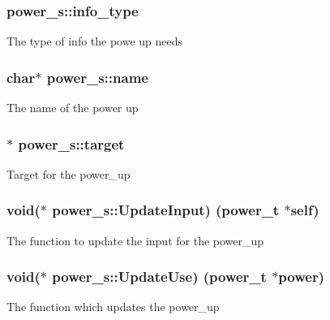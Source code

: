 \subsubsection[{\texorpdfstring{info\+\_\+type}{info_type}}]{ power\+\_\+s\+::info\+\_\+type}\hypertarget{structpower__s_a519c09477c21260a2be83a6ceb09cc33}{}\label{structpower__s_a519c09477c21260a2be83a6ceb09cc33}
The type of info the powe up needs 
\subsubsection[{\texorpdfstring{name}{name}}]{\setlength{\rightskip}{0pt plus 5cm}char$\ast$ power\+\_\+s\+::name}\hypertarget{structpower__s_a072da7e3651629b4b5bd3c1957449cd7}{}\label{structpower__s_a072da7e3651629b4b5bd3c1957449cd7}
The name of the power up 
\subsubsection[{\texorpdfstring{target}{target}}]{$\ast$ power\+\_\+s\+::target}\hypertarget{structpower__s_aec96005783c9c49c9998f580223370e5}{}\label{structpower__s_aec96005783c9c49c9998f580223370e5}
Target for the power\+\_\+up 
\subsubsection[{\texorpdfstring{Update\+Input}{UpdateInput}}]{\setlength{\rightskip}{0pt plus 5cm}void($\ast$ power\+\_\+s\+::\+Update\+Input) ({\bf power\+\_\+t} $\ast$self)}\hypertarget{structpower__s_a6a640bccecca9b06b6f45eab33374a8c}{}\label{structpower__s_a6a640bccecca9b06b6f45eab33374a8c}
The function to update the input for the power\+\_\+up 
\subsubsection[{\texorpdfstring{Update\+Use}{UpdateUse}}]{\setlength{\rightskip}{0pt plus 5cm}void($\ast$ power\+\_\+s\+::\+Update\+Use) ({\bf power\+\_\+t} $\ast$power)}\hypertarget{structpower__s_a26c1b68fef6f0a99d8188857bbb5ffb4}{}\label{structpower__s_a26c1b68fef6f0a99d8188857bbb5ffb4}
The function which updates the power\+\_\+up 
